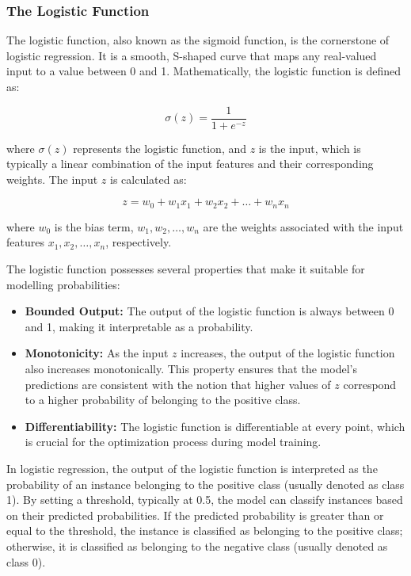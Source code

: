 \documentclass[letterpaper,10pt]{article}
\begin{document}
\subsubsection{The Logistic Function}
The logistic function, also known as the sigmoid function, is the cornerstone of logistic regression. It is a smooth, S-shaped curve that maps any real-valued input to a value between 0 and 1. Mathematically, the logistic function is defined as:

\[ \sigma(z) = \frac{1}{1 + e^{-z}} \]

where $\sigma(z)$ represents the logistic function, and $z$ is the input, which is typically a linear combination of the input features and their corresponding weights. The input $z$ is calculated as:

\[ z = w_0 + w_1x_1 + w_2x_2 + \ldots + w_nx_n \]

where $w_0$ is the bias term, $w_1, w_2, \ldots, w_n$ are the weights associated with the input features $x_1, x_2, \ldots, x_n$, respectively. \par

The logistic function possesses several properties that make it suitable for modelling probabilities:

\begin{itemize}
\item \textbf{Bounded Output:} The output of the logistic function is always between 0 and 1, making it interpretable as a probability.
\item \textbf{Monotonicity:} As the input $z$ increases, the output of the logistic function also increases monotonically. This property ensures that the model's predictions are consistent with the notion that higher values of $z$ correspond to a higher probability of belonging to the positive class.
\item \textbf{Differentiability:} The logistic function is differentiable at every point, which is crucial for the optimization process during model training.
\end{itemize}

In logistic regression, the output of the logistic function is interpreted as the probability of an instance belonging to the positive class (usually denoted as class 1). By setting a threshold, typically at 0.5, the model can classify instances based on their predicted probabilities. If the predicted probability is greater than or equal to the threshold, the instance is classified as belonging to the positive class; otherwise, it is classified as belonging to the negative class (usually denoted as class 0). \par
\end{document}
